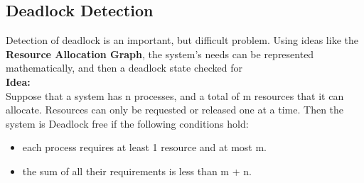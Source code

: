 \documentclass[a4paper, 10pt]{article}
\begin{document}
\subsection{Deadlock Detection}
Detection of deadlock is an important, but difficult problem. Using ideas like the \textbf{Resource Allocation Graph}, the system's needs can be represented mathematically, and then a deadlock state checked for\\[2ex]
\textbf{Idea:}\\
Suppose that a system has n processes, and a total of m resources that it can allocate. Resources can only be requested or released one at a time. Then the system is Deadlock free if the following conditions hold:
\begin{itemize}
    \item each process requires at least 1 resource and at most m.
    \item the sum of all their requirements is less than m + n.
\end{itemize}
\end{document}
